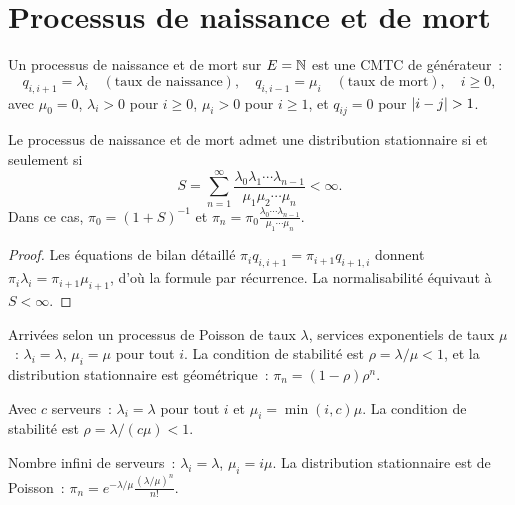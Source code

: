 \section{Processus de naissance et de mort}

\begin{definition}
Un processus de naissance et de mort sur $E = \mathbb{N}$ est une CMTC de g\'en\'erateur~:
\[
  q_{i,i+1} = \lambda_i \quad (\text{taux de naissance}), \quad
  q_{i,i-1} = \mu_i \quad (\text{taux de mort}), \quad i \geq 0,
\]
avec $\mu_0 = 0$, $\lambda_i > 0$ pour $i \geq 0$, $\mu_i > 0$ pour $i \geq 1$,
et $q_{ij} = 0$ pour $\left| i - j \right| > 1$.
\end{definition}

\begin{theoreme}
\label{thm:bd_stationnaire}
Le processus de naissance et de mort admet une distribution stationnaire si et
seulement si
\[
  S = \sum_{n=1}^{\infty} \frac{\lambda_0 \lambda_1 \cdots \lambda_{n-1}}
  {\mu_1 \mu_2 \cdots \mu_n} < \infty.
\]
Dans ce cas, $\pi_0 = (1 + S)^{-1}$ et
$\pi_n = \pi_0 \frac{\lambda_0 \cdots \lambda_{n-1}}{\mu_1 \cdots \mu_n}$.
\end{theoreme}

\begin{proof}
Les \'equations de bilan d\'etaill\'e $\pi_i q_{i,i+1} = \pi_{i+1} q_{i+1,i}$
donnent $\pi_i \lambda_i = \pi_{i+1} \mu_{i+1}$, d'o\`u la formule par r\'ecurrence.
La normalisabilit\'e \'equivaut \`a $S < \infty$.
\end{proof}

\begin{exemple}
Arriv\'ees selon un processus de Poisson de taux $\lambda$, services exponentiels
de taux $\mu$~: $\lambda_i = \lambda$, $\mu_i = \mu$ pour tout $i$. La condition
de stabilit\'e est $\rho = \lambda/\mu < 1$, et la distribution stationnaire est
g\'eom\'etrique~: $\pi_n = (1 - \rho)\rho^n$.
\end{exemple}

\begin{exemple}[File $M/M/c$]
Avec $c$ serveurs~: $\lambda_i = \lambda$ pour tout $i$ et
$\mu_i = \min(i, c) \mu$. La condition de stabilit\'e est $\rho = \lambda/(c\mu) < 1$.
\end{exemple}

\begin{exemple}
Nombre infini de serveurs~: $\lambda_i = \lambda$, $\mu_i = i\mu$.
La distribution stationnaire est de Poisson~: $\pi_n = e^{-\lambda/\mu}
\frac{(\lambda/\mu)^n}{n!}$.
\end{exemple}

